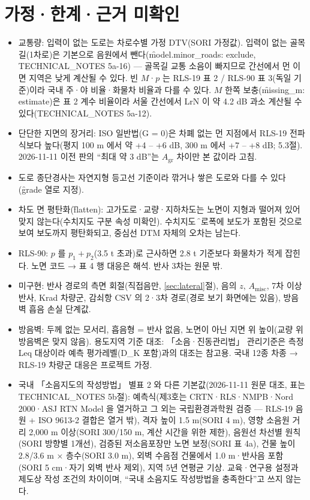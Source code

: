 \documentclass[10.5pt,a4paper]{article}
\begin{document}
\section{가정·한계·근거 미확인}
\begin{itemize}
\item 교통량: 입력이 없는 도로는 차로수별 가정 DTV(SORI 가정값). 입력이 없는 골목길(1차로)은 기본으로 음원에서 뺀다(\f{model.minor\_roads: exclude}, TECHNICAL\_NOTES 5a-16) — 골목길 교통 소음이 빠지므로 간선에서 먼 이면 지역은 낮게 계산될 수 있다. 빈 $M$·$p$ 는 RLS-19 표 2 / RLS-90 표 3(독일 기준)이라 국내 주·야 비율·화물차 비율과 다를 수 있다. $M$ 한쪽 보충(\f{missing\_m: estimate})은 표 2 계수 비율이라 서울 간선에서 LrN 이 약 4.2 dB 과소 계산될 수 있다(TECHNICAL\_NOTES 5a-12).
\item 단단한 지면의 장거리: ISO 일반법(G = 0)은 차폐 없는 먼 지점에서 RLS-19 전파식보다 높다(평지 100 m 에서 약 +4 – +6 dB, 300 m 에서 +7 – +8 dB; 5.3절). 2026-11-11 이전 판의 ``최대 약 3 dB''는 $A_\mathrm{gr}$ 차이만 본 값이라 고침.
\item 도로 종단경사는 자연지형 등고선 기준이라 깎거나 쌓은 도로와 다를 수 있다(\f{grade} 열로 지정).
\item 차도 면 평탄화(\f{flatten}): 고가도로·교량·지하차도는 노면이 지형과 떨어져 있어 맞지 않는다(수치지도 구분 속성 미확인). 수치지도 \f{도로폭}에 보도가 포함된 것으로 보여 보도까지 평탄화되고, 중심선 DTM 자체의 오차는 남는다.
\item RLS-90: $p$ 를 $p_1 + p_2$(3.5 t 초과)로 근사하면 2.8 t 기준보다 화물차가 적게 잡힌다. 노면 코드 → 표 4 행 대응은 해석. 반사 3차는 원문 밖.
\item 미구현: 반사 경로의 측면 회절(직접음만, \ref{sec:lateral}절), 음의 $z$, $A_\mathrm{misc}$, 7차 이상 반사, Krad 차량군, 감쇠항 CSV 의 2·3차 경로(경로 보기 화면에는 있음), 방음벽 흡음 손실 단계값.
\item 방음벽: 두께 없는 모서리, 흡음형 = 반사 없음, 노면이 아닌 지면 위 높이(교량 위 방음벽은 맞지 않음). 용도지역 기준 대조: 「소음·진동관리법」 관리기준은 측정 Leq 대상이라 예측 평가레벨(D\_K 포함)과의 대조는 참고용. 국내 12종 차종 → RLS-19 차량군 대응은 프로젝트 가정.
\item 국내 「소음지도의 작성방법」 별표 2 와 다른 기본값(2026-11-11 원문 대조, 표는 TECHNICAL\_NOTES 5b절): 예측식(제3호는 CRTN·RLS·NMPB·Nord 2000·ASJ RTN Model 을 열거하고 그 외는 국립환경과학원 검증 — RLS-19 음원 + ISO 9613-2 결합은 열거 밖), 격자 높이 1.5 m(SORI 4 m), 영향 소음원 거리 2,000 m 이상(SORI 300/150 m, 계산 시간을 위한 제한), 음원선 차선별 원칙(SORI 방향별 1개선), 검증된 저소음포장만 노면 보정(SORI 표 4a), 건물 높이 2.8/3.6 m × 층수(SORI 3.0 m), 외벽 수음점 건물에서 1.0 m·반사음 포함(SORI 5 cm·자기 외벽 반사 제외), 지역 5년 연평균 기상. 교육·연구용 설정과 제도상 작성 조건의 차이이며, ``국내 소음지도 작성방법을 충족한다''고 쓰지 않는다.

\end{itemize}
\end{document}

